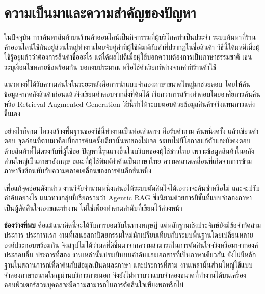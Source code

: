 
\section{ความเป็นมาและความสำคัญของปัญหา}

ในปัจจุบัน การค้นหาสินค้าบนร้านค้าออนไลน์เป็นกิจกรรมที่ผู้บริโภคทำเป็นประจำ ระบบค้นหาที่ร้านค้าออนไลน์ใช้กันอยู่ส่วนใหญ่ทำงานโดยจับคู่คำที่ผู้ใช้พิมพ์กับคำที่ปรากฏในชื่อสินค้า วิธีนี้ได้ผลดีเมื่อผู้ใช้รู้อยู่แล้วว่าต้องการสินค้าชื่ออะไร แต่ได้ผลไม่ดีเมื่อผู้ใช้บอกความต้องการเป็นภาษาธรรมชาติ เช่น ระบุเงื่อนไขหลายข้อพร้อมกัน บอกงบประมาณ หรือใช้คำเรียกที่ต่างจากคำที่ร้านค้าใช้

แนวทางที่ได้รับความสนใจในระยะหลังคือการนำแบบจำลองภาษาขนาดใหญ่มาช่วยตอบ โดยให้ค้นข้อมูลจากคลังสินค้าก่อนแล้วจึงเขียนคำตอบจากสิ่งที่ค้นได้ เรียกว่าการสร้างคำตอบโดยอาศัยการค้นคืน หรือ Retrieval-Augmented Generation \cite{lewis2020rag} วิธีนี้ทำให้ระบบตอบด้วยข้อมูลสินค้าจริงแทนการแต่งขึ้นเอง

อย่างไรก็ตาม โครงสร้างพื้นฐานของวิธีนี้ทำงานเป็นท่อเส้นตรง คือรับคำถาม ค้นหนึ่งครั้ง แล้วเขียนคำตอบ จุดอ่อนที่ตามมาคือเมื่อการค้นครั้งเดียวนั้นหาของไม่เจอ ระบบไม่มีโอกาสแก้ตัวและยังคงตอบด้วยสินค้าที่ไม่ตรงกับที่ผู้ใช้ขอ ปัญหานี้รุนแรงขึ้นในบริบทของผู้ใช้ชาวไทย เพราะข้อมูลสินค้าในคลังส่วนใหญ่เป็นภาษาอังกฤษ ขณะที่ผู้ใช้พิมพ์คำค้นเป็นภาษาไทย ความคลาดเคลื่อนที่เกิดจากการข้ามภาษาจึงซ้อนทับกับความคลาดเคลื่อนของการค้นอีกชั้นหนึ่ง

เพื่อแก้จุดอ่อนดังกล่าว งานวิจัยจำนวนหนึ่งเสนอให้ระบบตัดสินใจได้เองว่าจะค้นซ้ำหรือไม่ และจะปรับคำค้นอย่างไร \cite{jeong2024adaptive, yan2024crag} แนวทางกลุ่มนี้เรียกรวมว่า Agentic RAG ซึ่งนิยามด้วยการมีชั้นที่แบบจำลองภาษาเป็นผู้ตัดสินใจเองขณะทำงาน ไม่ใช่เพียงทำตามลำดับที่เขียนไว้ล่วงหน้า \cite{singh2025agentic}

\textbf{ช่องว่างที่พบ} คือแม้แนวคิดนี้จะได้รับการยอมรับในทางทฤษฎี แต่หลักฐานเชิงประจักษ์ยังมีข้อจำกัดสามประการ ประการแรก งานที่เสนอสถาปัตยกรรมใหม่มักเปรียบเทียบกับระบบพื้นฐานโดยเปลี่ยนหลายองค์ประกอบพร้อมกัน จึงสรุปไม่ได้ว่าผลที่ดีขึ้นมาจากความสามารถในการตัดสินใจจริงหรือมาจากองค์ประกอบอื่น ประการที่สอง งานเหล่านั้นประเมินบนคำค้นและเอกสารที่เป็นภาษาเดียวกัน ยังไม่มีหลักฐานในสถานการณ์ที่คำค้นกับข้อมูลเป็นคนละภาษา และประการที่สาม งานเหล่านั้นส่วนใหญ่ใช้แบบจำลองภาษาขนาดใหญ่ผ่านบริการภายนอก จึงยังไม่ทราบว่าแบบจำลองขนาดที่ทำงานได้บนเครื่องคอมพิวเตอร์ส่วนบุคคลจะมีความสามารถในการตัดสินใจเพียงพอหรือไม่

